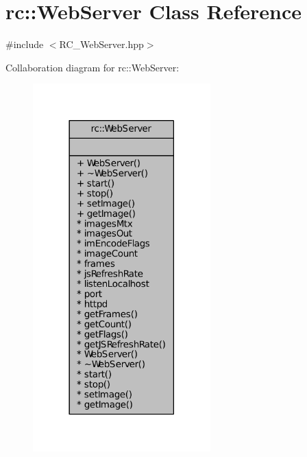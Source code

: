 \hypertarget{classrc_1_1WebServer}{\section{rc\+:\+:Web\+Server Class Reference}
\label{classrc_1_1WebServer}
}


{\ttfamily \#include $<$R\+C\+\_\+\+Web\+Server.\+hpp$>$}



Collaboration diagram for rc\+:\+:Web\+Server\+:\nopagebreak
\begin{figure}[H]
\begin{center}
\leavevmode
\includegraphics[width=194pt]{classrc_1_1WebServer__coll__graph}
\end{center}
\end{figure}
